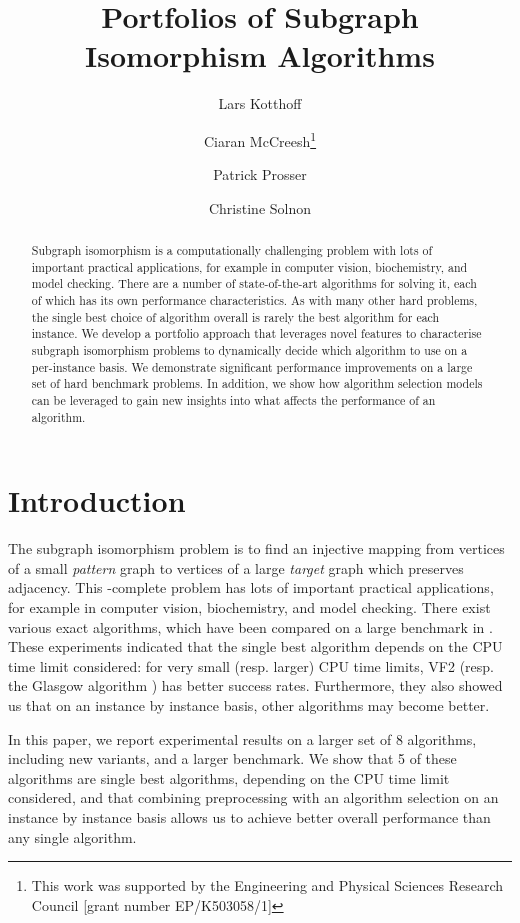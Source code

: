 \documentclass{llncs}
\title{Portfolios of Subgraph Isomorphism Algorithms}
\author{
    Lars Kotthoff\inst{1}
    \and Ciaran McCreesh\thanks{This work was supported by the Engineering
        and Physical Sciences Research Council [grant number EP/K503058/1]}\inst{2}
    \and Patrick Prosser\inst{2}
    \and Christine Solnon\inst{3}}
\institute{
    University of British Columbia, Vancouver, Canada
    \and University of Glasgow, Glasgow, Scotland
    \and INSA-Lyon, LIRIS, UMR5205, F-69621, France}
\begin{document}
\maketitle

\begin{abstract}
Subgraph isomorphism is a computationally challenging problem with lots of important practical
applications, for example in computer vision, biochemistry, and model checking. There are a number
of state-of-the-art algorithms for solving it, each of which has its own performance
characteristics. As with many other hard problems, the single best choice of algorithm overall is
rarely the best algorithm for each instance. We develop a portfolio approach that leverages novel
features to characterise subgraph isomorphism problems to dynamically decide which algorithm to use
on a per-instance basis. We demonstrate significant performance improvements on a large set of hard
benchmark problems. In addition, we show how algorithm selection models can be leveraged to gain new
insights into what affects the performance of an algorithm.
\end{abstract}

\section{Introduction}

The subgraph isomorphism problem is to find an injective mapping from vertices of a small
\emph{pattern} graph to vertices of a large \emph{target} graph which preserves adjacency. This
\NP-complete problem has lots of important practical applications, for example in computer vision,
biochemistry, and model checking. There exist various exact algorithms, which have been compared on
a large benchmark in  \cite{McCreesh:2015}. These experiments indicated that the single best
algorithm depends on the CPU time limit considered: for very small (resp. larger) CPU time limits,
VF2 \cite{Cordella:2004} (resp. the Glasgow algorithm \cite{McCreesh:2015}) has better success
rates. Furthermore, they also showed us that on an instance by instance basis, other algorithms may
become better.

In this paper, we report experimental results on a larger set of 8 algorithms, including new
variants, and a larger benchmark. We show that 5 of these algorithms are single best algorithms,
depending on the CPU time limit considered, and that combining preprocessing with an algorithm
selection on an instance by instance basis allows us to achieve better overall performance than any
single algorithm.
\end{document}
